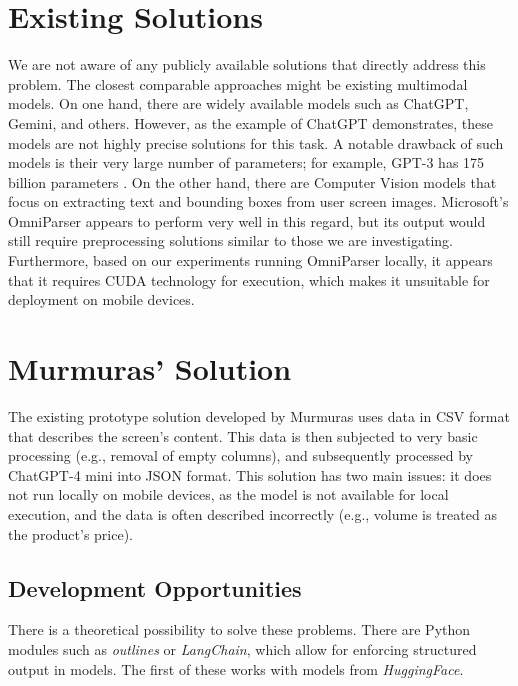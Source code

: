 \documentclass[12pt]{article}
\begin{document}
\section*{Existing Solutions}
We are not aware of any publicly available solutions that directly address this problem. The closest comparable approaches might be existing multimodal models. On one hand, there are widely available models such as ChatGPT, Gemini, and others. However, as the example of ChatGPT demonstrates, these models are not highly precise solutions for this task. A notable drawback of such models is their very large number of parameters; for example, GPT-3 has 175 billion parameters \cite{brown2020languagemodelsfewshotlearners}. On the other hand, there are Computer Vision models that focus on extracting text and bounding boxes from user screen images. Microsoft's OmniParser \cite{lu2024omniparserpurevisionbased} appears to perform very well in this regard, but its output would still require preprocessing solutions similar to those we are investigating. Furthermore, based on our experiments running OmniParser locally, it appears that it requires CUDA technology for execution, which makes it unsuitable for deployment on mobile devices.

\section*{Murmuras' Solution}
The existing prototype solution developed by Murmuras uses data in CSV format that describes the screen's content. This data is then subjected to very basic processing (e.g., removal of empty columns), and subsequently processed by ChatGPT-4 mini into JSON format. This solution has two main issues: it does not run locally on mobile devices, as the model is not available for local execution, and the data is often described incorrectly (e.g., volume is treated as the product's price).

\subsection*{Development Opportunities}
There is a theoretical possibility to solve these problems. There are Python modules such as \textit{outlines}\cite{willard2023efficient} or \textit{LangChain}\cite{Chase_LangChain_2022}, which allow for enforcing structured output in models. The first of these works with models from \textit{HuggingFace}.
\end{document}
